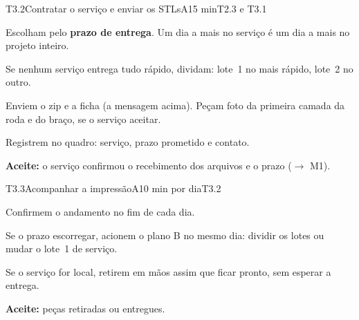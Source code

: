 \documentclass[11pt,a4paper]{article}
\newcommand{\flecha}{\ensuremath{\rightarrow}}
\begin{document}
\begin{tarefa}[critica]{T3.2}{Contratar o serviço e enviar os STLs}{A}{15 min}{T2.3 e T3.1}
\begin{passos}
  \item Escolham pelo \textbf{prazo de entrega}. Um dia a mais no serviço é um dia a mais no
    projeto inteiro.
  \item Se nenhum serviço entrega tudo rápido, dividam: lote~1 no mais rápido, lote~2 no
    outro.
  \item Enviem o zip e a ficha (a mensagem acima). Peçam foto da primeira camada da roda e do
    braço, se o serviço aceitar.
  \item Registrem no quadro: serviço, prazo prometido e contato.
\end{passos}
\textbf{Aceite:} o serviço confirmou o recebimento dos arquivos e o prazo (\flecha{} M1).
\end{tarefa}

\begin{tarefa}{T3.3}{Acompanhar a impressão}{A}{10 min por dia}{T3.2}
\begin{passos}
  \item Confirmem o andamento no fim de cada dia.
  \item Se o prazo escorregar, acionem o plano B no mesmo dia: dividir os lotes ou mudar o
    lote~1 de serviço.
  \item Se o serviço for local, retirem em mãos assim que ficar pronto, sem esperar a
    entrega.
\end{passos}
\textbf{Aceite:} peças retiradas ou entregues.
\end{tarefa}
\end{document}

